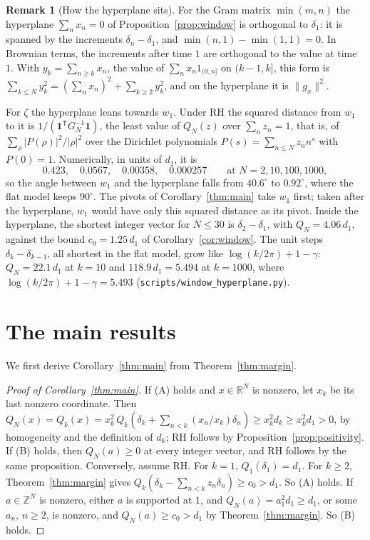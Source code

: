 \documentclass[11pt]{article}
\theoremstyle{definition}
\newtheorem*{remark}{Remark}
\begin{document}
\begin{remark}[How the hyperplane sits]
For the Gram matrix $\min(m, n)$ the hyperplane $\sum_n x_n = 0$ of Proposition~\ref{prop:window} is orthogonal to
$\delta_1$: it is spanned by the increments $\delta_n - \delta_1$, and $\min(n, 1) - \min(1, 1) = 0$. In Brownian terms,
the increments after time $1$ are orthogonal to the value at time $1$. With $y_k = \sum_{n \ge k} x_n$, the value of
$\sum_n x_n 1_{(0, n]}$ on $(k - 1, k]$, this form is $\sum_{k
\le N} y_k^2 = (\sum_n x_n)^2 + \sum_{k \ge 2} y_k^2$, and
on the hyperplane it is $\|g_x\|^2$.

For $\zeta$ the hyperplane leans towards $w_1$. Under RH the squared distance from $w_1$ to it is $1/(\mathbf
1^{\mathsf T} G_N^{-1} \mathbf 1)$, the least value of $Q_N(z)$ over $\sum_n z_n = 1$, that is, of $\sum_\rho
|P(\rho)|^2/|\rho|^2$ over the Dirichlet polynomials $P(s) = \sum_{n \le N} z_n n^s$ with $P(0) = 1$.
Numerically, in units of $d_1$, it is
\[
0.423, \quad 0.0567, \quad 0.00358, \quad 0.000257 \qquad \text{at } N = 2, 10, 100, 1000,
\]
so the angle between $w_1$ and the hyperplane falls from $40.6^\circ$ to $0.92^\circ$, where the flat model keeps
$90^\circ$. The pivots of Corollary~\ref{thm:main} take $w_1$ first; taken after the hyperplane, $w_1$ would have only
this squared distance as its pivot. Inside the hyperplane, the shortest integer vector for $N \le 30$ is $\delta_2 -
\delta_1$, with $Q_N = 4.06\,d_1$, against the bound $c_0 = 1.25\,d_1$ of Corollary~\ref{cor:window}. The unit steps
$\delta_k - \delta_{k - 1}$, all shortest in the flat model, grow like $\log(k/2\pi) + 1 - \gamma$: $Q_N = 22.1\,d_1$ at
$k = 10$ and $118.9\,d_1 = 5.494$ at $k = 1000$, where $\log(k/2\pi) + 1 - \gamma = 5.493$
(\texttt{scripts/window\_hyperplane.py}).
\end{remark}

\section{The main results}\label{sec:results}

We first derive Corollary~\ref{thm:main} from Theorem~\ref{thm:margin}.

\begin{proof}[Proof of Corollary~\ref{thm:main}]
If (A) holds and $x \in \mathbb R^N$ is nonzero, let $x_k$ be its last nonzero coordinate. Then $Q_N(x) = Q_k(x) =
x_k^2\, Q_k(\delta_k + \sum_{n < k} (x_n/x_k)\delta_n) \ge x_k^2 d_k \ge x_k^2 d_1 > 0$, by homogeneity and the
definition of $d_k$; RH follows by Proposition~\ref{prop:positivity}. If (B) holds, then $Q_N(a) \ge 0$ at every
integer vector, and RH follows by the
same proposition. Conversely, assume RH. For $k = 1$, $Q_1(\delta_1)
= d_1$. For $k \ge 2$, Theorem~\ref{thm:margin} gives
$Q_k(\delta_k - \sum_{n < k} z_n \delta_n) \ge c_0 > d_1$. So (A) holds. If $a \in \mathbb
Z^N$ is nonzero, either $a$ is supported at $1$, and $Q_N(a) = a_1^2 d_1 \ge d_1$, or some $a_n$, $n \ge 2$, is
nonzero, and $Q_N(a) \ge c_0 > d_1$ by Theorem~\ref{thm:margin}. So (B) holds.
\end{proof}
\end{document}
